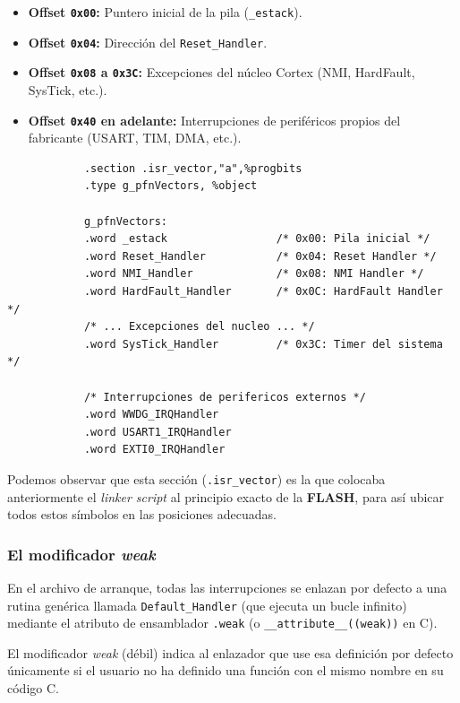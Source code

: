 \documentclass[../main.tex]{subfiles}
\begin{document}
        \begin{itemize}
            \item \textbf{Offset \texttt{0x00}:} Puntero inicial de la pila (\texttt{\_estack}).
            \item \textbf{Offset \texttt{0x04}:} Dirección del \lstinline|Reset_Handler|.
            \item \textbf{Offset \texttt{0x08} a \texttt{0x3C}:} Excepciones del núcleo Cortex (NMI, HardFault, SysTick, etc.).
            \item \textbf{Offset \texttt{0x40} en adelante:} Interrupciones de periféricos propios del fabricante (USART, TIM, DMA, etc.).
        \end{itemize}

        \begin{lstlisting}
            .section .isr_vector,"a",%progbits
            .type g_pfnVectors, %object

            g_pfnVectors:
            .word _estack                 /* 0x00: Pila inicial */
            .word Reset_Handler           /* 0x04: Reset Handler */
            .word NMI_Handler             /* 0x08: NMI Handler */
            .word HardFault_Handler       /* 0x0C: HardFault Handler */
            /* ... Excepciones del nucleo ... */
            .word SysTick_Handler         /* 0x3C: Timer del sistema */
            
            /* Interrupciones de perifericos externos */
            .word WWDG_IRQHandler
            .word USART1_IRQHandler
            .word EXTI0_IRQHandler
        \end{lstlisting}

        Podemos observar que esta sección (\texttt{.isr\_vector}) es la que colocaba anteriormente el \emph{linker script} al principio exacto de la \textbf{FLASH}, para así ubicar todos estos símbolos en las posiciones adecuadas.

        \subsubsection{El modificador \emph{weak}}

            En el archivo de arranque, todas las interrupciones se enlazan por defecto a una rutina genérica llamada \lstinline|Default_Handler| (que ejecuta un bucle infinito) mediante el atributo de ensamblador \texttt{.weak} (o \texttt{\_\_attribute\_\_((weak))} en C).

            El modificador \emph{weak} (débil) indica al enlazador que use esa definición por defecto únicamente si el usuario no ha definido una función con el mismo nombre en su código C. 
\end{document}
